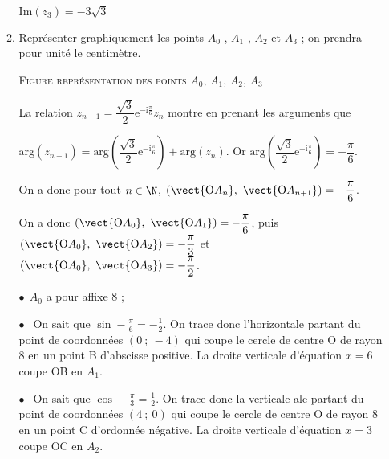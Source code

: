 \documentclass{cornouaille}
\begin{document}
\begin{exercice}
\begin{enumerate}
\begin{enumerate}
\begin{solution}
$\boxed{ \text{Im}\left(z_3\right) = - 3\sqrt{3} }$
\end{solution}
		\item Représenter graphiquement les points $A_0$ , $A_1$ , $A_2$ et $A_3$ ; on prendra pour unité le centimètre.
		
\begin{solution}
\textsc{Figure représentation des points $A_0$, \:$A_1$, \:$A_2$, \:$A_3$}

La relation $z_{n+1} = \dfrac{\sqrt{3}}{2}\text{e}^{- \text{i}\frac{\pi}{6}}z_n$ montre en prenant les arguments que 

arg$\left(z_{n+1} \right) = \text{arg}\left(\dfrac{\sqrt{3}}{2}\text{e}^{- \text{i}\frac{\pi}{6}}\right) + \text{arg}\left(z_n\right)$.
Or $\text{arg}\left(\dfrac{\sqrt{3}}{2}\text{e}^{- \text{i}\frac{\pi}{6}} \right) = - \dfrac{\pi}{6}$.

On a donc pour tout $n \in \N$, $\left(\vect{\text{O}A_n},~\vect{\text{O}A_{n+1}} \right) = - \dfrac{\pi}{6}$.

On a donc $\left(\vect{\text{O}A_0},~\vect{\text{O}A_{1}} \right) = - \dfrac{\pi}{6}$, puis 
$\left(\vect{\text{O}A_0},~\vect{\text{O}A_{2}} \right) = - \dfrac{\pi}{3}$ et $\left(\vect{\text{O}A_0},~\vect{\text{O}A_{3}} \right) = - \dfrac{\pi}{2}$.

\smallskip

$\bullet~~$$A_0$ a pour affixe 8 ;

$\bullet~~$ On sait que $\sin - \frac{\pi}{6} = - \frac{1}{2}$. On trace donc l'horizontale partant du point de coordonnées $(0~;~- 4)$ qui coupe le cercle de centre O de rayon 8 en un point B d'abscisse positive. La droite verticale d'équation $x = 6$ coupe OB en $A_1$.

$\bullet~~$ On sait que $\cos - \frac{\pi}{3} =  \frac{1}{2}$. On trace donc la verticale ale partant du point de coordonnées $(4~;~0)$ qui coupe le cercle de centre O de rayon 8 en un point C d'ordonnée négative. La droite verticale  d'équation $x = 3$ coupe OC en $A_2$.


\end{solution}
\end{enumerate}
\end{enumerate}
\end{exercice}
\end{document}
